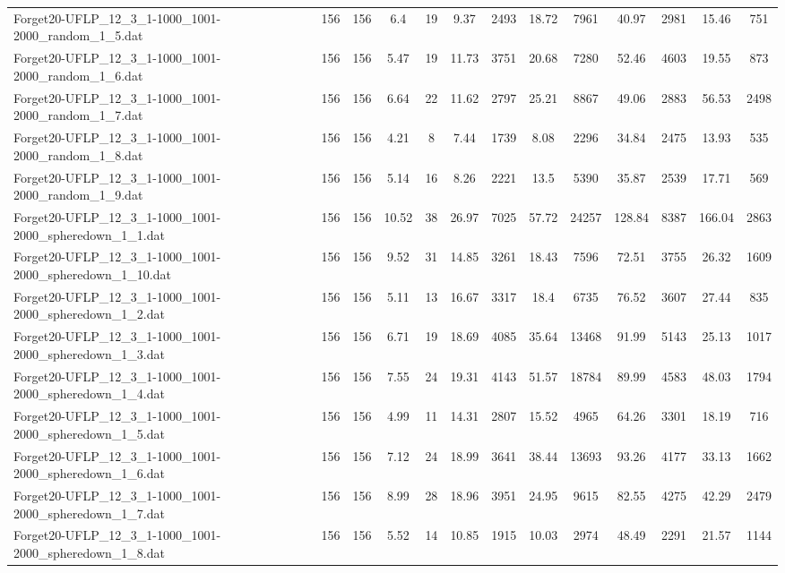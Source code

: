 \begin{table}[!ht]
{\begin{tabular}{lcccccccccccc}
Forget20-UFLP\_12\_3\_1-1000\_1001-2000\_random\_1\_5.dat & 156 & 156 & 6.4 & 19 & 9.37 & 2493 & 18.72 & 7961 & 40.97 & 2981 & 15.46 & 751 \\
Forget20-UFLP\_12\_3\_1-1000\_1001-2000\_random\_1\_6.dat & 156 & 156 & 5.47 & 19 & 11.73 & 3751 & 20.68 & 7280 & 52.46 & 4603 & 19.55 & 873 \\
Forget20-UFLP\_12\_3\_1-1000\_1001-2000\_random\_1\_7.dat & 156 & 156 & 6.64 & 22 & 11.62 & 2797 & 25.21 & 8867 & 49.06 & 2883 & 56.53 & 2498 \\
Forget20-UFLP\_12\_3\_1-1000\_1001-2000\_random\_1\_8.dat & 156 & 156 & 4.21 & 8 & 7.44 & 1739 & 8.08 & 2296 & 34.84 & 2475 & 13.93 & 535 \\
Forget20-UFLP\_12\_3\_1-1000\_1001-2000\_random\_1\_9.dat & 156 & 156 & 5.14 & 16 & 8.26 & 2221 & 13.5 & 5390 & 35.87 & 2539 & 17.71 & 569 \\
Forget20-UFLP\_12\_3\_1-1000\_1001-2000\_spheredown\_1\_1.dat & 156 & 156 & 10.52 & 38 & 26.97 & 7025 & 57.72 & 24257 & 128.84 & 8387 & 166.04 & 2863 \\
Forget20-UFLP\_12\_3\_1-1000\_1001-2000\_spheredown\_1\_10.dat & 156 & 156 & 9.52 & 31 & 14.85 & 3261 & 18.43 & 7596 & 72.51 & 3755 & 26.32 & 1609 \\
Forget20-UFLP\_12\_3\_1-1000\_1001-2000\_spheredown\_1\_2.dat & 156 & 156 & 5.11 & 13 & 16.67 & 3317 & 18.4 & 6735 & 76.52 & 3607 & 27.44 & 835 \\
Forget20-UFLP\_12\_3\_1-1000\_1001-2000\_spheredown\_1\_3.dat & 156 & 156 & 6.71 & 19 & 18.69 & 4085 & 35.64 & 13468 & 91.99 & 5143 & 25.13 & 1017 \\
Forget20-UFLP\_12\_3\_1-1000\_1001-2000\_spheredown\_1\_4.dat & 156 & 156 & 7.55 & 24 & 19.31 & 4143 & 51.57 & 18784 & 89.99 & 4583 & 48.03 & 1794 \\
Forget20-UFLP\_12\_3\_1-1000\_1001-2000\_spheredown\_1\_5.dat & 156 & 156 & 4.99 & 11 & 14.31 & 2807 & 15.52 & 4965 & 64.26 & 3301 & 18.19 & 716 \\
Forget20-UFLP\_12\_3\_1-1000\_1001-2000\_spheredown\_1\_6.dat & 156 & 156 & 7.12 & 24 & 18.99 & 3641 & 38.44 & 13693 & 93.26 & 4177 & 33.13 & 1662 \\
Forget20-UFLP\_12\_3\_1-1000\_1001-2000\_spheredown\_1\_7.dat & 156 & 156 & 8.99 & 28 & 18.96 & 3951 & 24.95 & 9615 & 82.55 & 4275 & 42.29 & 2479 \\
Forget20-UFLP\_12\_3\_1-1000\_1001-2000\_spheredown\_1\_8.dat & 156 & 156 & 5.52 & 14 & 10.85 & 1915 & 10.03 & 2974 & 48.49 & 2291 & 21.57 & 1144 \\

\end{tabular}}
\end{table}
